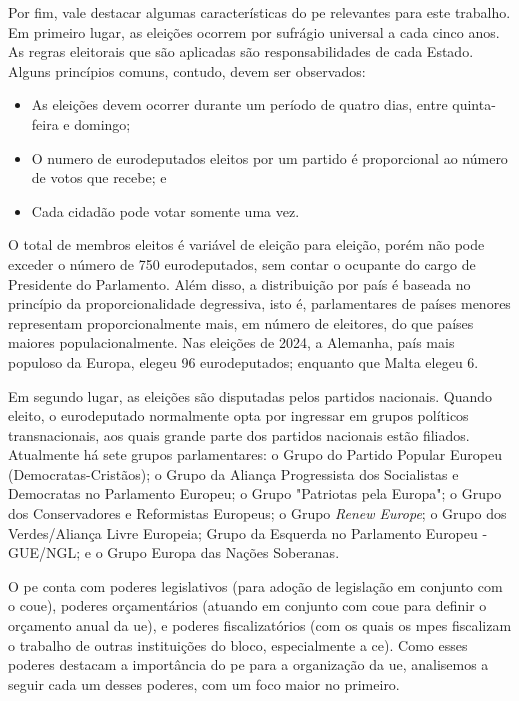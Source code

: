 Por fim, vale destacar algumas características do \acrshort{pe} relevantes para este trabalho. Em primeiro lugar, as eleições ocorrem por sufrágio universal a cada cinco anos. As regras eleitorais que são aplicadas são responsabilidades de cada Estado. Alguns princípios comuns, contudo, devem ser observados:
\begin{itemize}
    \item As eleições devem ocorrer durante um período de quatro dias, entre quinta-feira e domingo;
    \item O numero de eurodeputados eleitos por um partido é proporcional ao número de votos que recebe; e
    \item Cada cidadão pode votar somente uma vez.
\end{itemize}

O total de membros eleitos é variável de eleição para eleição, porém não pode exceder o número de 750 eurodeputados, sem contar o ocupante do cargo de Presidente do Parlamento. Além disso, a distribuição por país é baseada no princípio da proporcionalidade degressiva, isto é, parlamentares de países menores representam proporcionalmente mais, em número de eleitores, do que países maiores populacionalmente. Nas eleições de 2024, a Alemanha, país mais populoso da Europa, elegeu 96 eurodeputados; enquanto que Malta elegeu 6.

Em segundo lugar, as eleições são disputadas pelos partidos nacionais. Quando eleito, o eurodeputado normalmente opta por ingressar em grupos políticos transnacionais, aos quais grande parte dos partidos nacionais estão filiados. Atualmente há sete grupos parlamentares: o Grupo do Partido Popular Europeu (Democratas-Cristãos); o Grupo da Aliança Progressista dos Socialistas e Democratas no Parlamento Europeu; o Grupo "Patriotas pela Europa"; o Grupo dos Conservadores e Reformistas Europeus; o Grupo \textit{Renew Europe}; o Grupo dos Verdes/Aliança Livre Europeia; Grupo da Esquerda no Parlamento Europeu - GUE/NGL; e o Grupo Europa das Nações Soberanas.
 
O \acrshort{pe} conta com poderes legislativos (para adoção de legislação em conjunto com o \acrshort{coue}), poderes orçamentários (atuando em conjunto com \acrshort{coue} para definir o orçamento anual da \acrshort{ue}), e poderes fiscalizatórios (com os quais os \acrshort{mpe}s fiscalizam o trabalho de outras instituições do bloco, especialmente a \acrshort{ce}). Como esses poderes destacam a importância do \acrshort{pe} para a organização da \acrshort{ue}, analisemos a seguir cada um desses poderes, com um foco maior no primeiro.